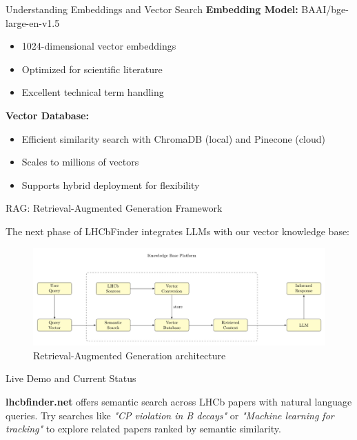 \documentclass[final]{beamer}
\newlength{\colwidth}
\begin{document}
\begin{frame}[t]
\begin{columns}[t]
\begin{column}{\colwidth}
\begin{block}{Understanding Embeddings and Vector Search}
    \textbf{Embedding Model:} BAAI/bge-large-en-v1.5
    \begin{itemize}
      \item 1024-dimensional vector embeddings
      \item Optimized for scientific literature
      \item Excellent technical term handling
    \end{itemize}
    
    \textbf{Vector Database:}
    \begin{itemize}
      \item Efficient similarity search with ChromaDB (local) and Pinecone (cloud)
      \item Scales to millions of vectors
      \item Supports hybrid deployment for flexibility
    \end{itemize}
    
  \end{block}

  \begin{block}{RAG: Retrieval-Augmented Generation Framework}
    
    The next phase of LHCbFinder integrates LLMs with our vector knowledge base:
    
    \begin{figure}
      \centering
\includegraphics[scale=1.4]{figure3-rag-architecture.pdf}
      \caption{Retrieval-Augmented Generation architecture}
    \end{figure}
    
  \end{block}

\vspace{5cm}
  \begin{exampleblock}{Live Demo and Current Status}
    
    \textbf{lhcbfinder.net} offers semantic search across LHCb papers with natural language queries. Try searches like \textit{"CP violation in B decays"} or \textit{"Machine learning for tracking"} to explore related papers ranked by semantic similarity.
    

\end{exampleblock}
\end{column}
\end{columns}
\end{frame}
\end{document}
